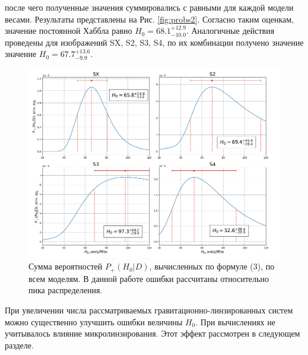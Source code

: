 \noindent после чего полученные значения суммировались с равными для каждой модели весами. Результаты представлены на Рис. \ref{fig:probs2}. Согласно таким оценкам, значение постоянной Хаббла равно $H_0=68.1_{-10.0}^{+12.9}$. Аналогичные действия проведены для изображений SX, S2, S3, S4, по их комбинации получено значение значение $H_0=67.7_{-9.9}^{+13.6}$.

\begin{figure}[H]
    \centering
	\includegraphics[width=0.99\linewidth]{pics/H0-SX234.png}
	\caption{Сумма вероятностей $P_{+}( H_0 |D)$, вычисленных по формуле (3), по всем моделям. В данной работе ошибки рассчитаны относительно пика распределения.}
	\label{fig:sumprobs}
\end{figure}

При увеличении числа рассматриваемых гравитационно-линзированных систем можно существенно улучшить ошибки величины $H_0$. При вычислениях не учитывалось влияние микролинзирования. Этот эффект рассмотрен в следующем разделе.

\newpage


